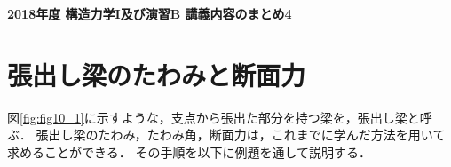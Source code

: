 \documentclass[10pt,a4j]{jarticle}
\newlength{\minitwocolumn}
\begin{document}
\newcommand{\fat}[1]{\mbox{\boldmath $#1$}}
\newcommand{\D}{\partial}
\newcommand{\w}{\omega}
\newcommand{\ga}{\alpha}
\newcommand{\gb}{\beta}
\newcommand{\gx}{\xi}
\newcommand{\gz}{\zeta}
\newcommand{\vhat}[1]{\hat{\fat{#1}}}
\newcommand{\spc}{\vspace{0.7\baselineskip}}
\newcommand{\halfspc}{\vspace{0.3\baselineskip}}

\newcommand{\twofig}[2]
 {
   \begin{figure}
     \begin{minipage}[t]{\minitwocolumn}
         \begin{center}   #1
         \end{center}
     \end{minipage}
         \hspace{\columnsep}
     \begin{minipage}[t]{\minitwocolumn}
         \begin{center} #2
         \end{center}
     \end{minipage}
   \end{figure}
 }
\begin{center}
	{\Large \bf 2018年度 構造力学I及び演習B 講義内容のまとめ4} \\
\end{center}
\section{張出し梁のたわみと断面力}
図\ref{fig:fig10_1}に示すような，支点から張出た部分を持つ梁を，張出し梁と呼ぶ．
張出し梁のたわみ，たわみ角，断面力は，これまでに学んだ方法を用いて求めることができる．
その手順を以下に例題を通して説明する．
\end{document}
